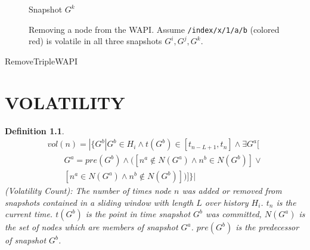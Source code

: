 \documentclass[abstracton,12pt]{scrreprt}
\newtheorem{definition}{Definition}
\begin{document}
\begin{figure}[h]
\begin{scriptsize}
\begin{multicols}{3}
\begin{center}
                Snapshot $G^k$
            \end{center}
        \end{multicols}
    \end{scriptsize}
    \caption{Removing a node from the WAPI. Assume \texttt{/index/x/1/a/b} (colored red) is volatile in all three snapshots $G^i, G^j, G^k$.}
    \label{fig:remove_wapi}
\end{figure}

\begin{algorithm}[H]
    \label{algo:remove_triple_wapi}
    \caption{RemoveTripleWAPI}
    \DontPrintSemicolon
    \begin{footnotesize}
    \end{footnotesize}
\end{algorithm}

\chapter{VOLATILITY}
\label{ch:volatility}

\begin{definition}
    \begin{equation}
        \begin{split}
            vol(n) = | \{ G^b | G^b \in H_i \land t(G^b) \in [t_{n-L+1}, t_n] \land \exists G^a[ \\
            \qquad G^a = pre(G^b) \land ([n^a \notin N(G^a) \land n^b \in N(G^b)]\lor \\
            \qquad [n^a \in N(G^a) \land n^b \notin N(G^b)] )]\} |
        \end{split}
    \end{equation}
    (Volatility Count): The number of times node $n$ was added or removed from snapshots contained in a sliding window with length $L$ over history $H_i$.
    $t_n$ is the current time.
    $t(G^b)$ is the point in time snapshot $G^b$ was committed, $N(G^a)$ is the set of nodes which are members of snapshot $G^a$.
    $pre(G^b)$ is the predecessor of snapshot $G^b$.
    \label{def:vol_count}
\end{definition}
\end{document}
